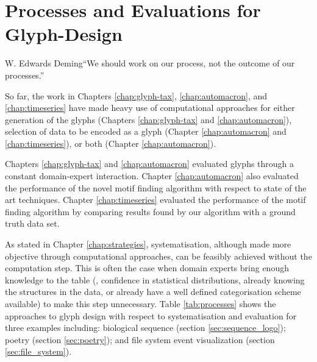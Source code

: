 \chapter{Processes and Evaluations for Glyph-Design}
\label{chap:processes}

\begin{chapquote}{W. Edwards Deming}{``We should work on our process, not the outcome of our processes.''}
\end{chapquote}

So far, the work in Chapters \ref{chap:glyph-tax}, \ref{chap:automacron}, and \ref{chap:timeseries} have made heavy use of computational approaches for either generation of the glyphs (Chapters \ref{chap:glyph-tax} and \ref{chap:automacron}), selection of data to be encoded as a glyph (Chapter \ref{chap:automacron} and \ref{chap:timeseries}), or both (Chapter \ref{chap:automacron}).


Chapters \ref{chap:glyph-tax} and \ref{chap:automacron} evaluated glyphs through a constant domain-expert interaction.
Chapter \ref{chap:automacron} also evaluated the performance of the novel motif finding algorithm with respect to state of the art techniques.
Chapter \ref{chap:timeseries} evaluated the performance of the motif finding algorithm by comparing results found by our algorithm with a ground truth data set.

As stated in Chapter \ref{chap:strategies}, systematisation, although made more objective through computational approaches, can be feasibly achieved without the computation step.
This is often the case when domain experts bring enough knowledge to the table (\eg, confidence in statistical distributions, already knowing the structures in the data, or already have a well defined categorisation scheme available) to make this step unnecessary.
Table \ref{tab:processes} shows the approaches to glyph design with respect to systematisation and evaluation for three examples including: biological sequence (section \ref{sec:sequence_logo}); poetry (section \ref{sec:poetry}); and file system event visualization (section \ref{sec:file_system}).


